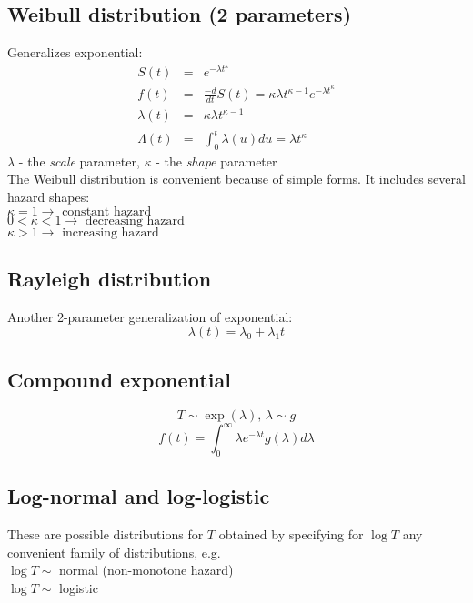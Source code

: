 \documentclass[11pt,slidesonly,semrot,portrait,palatino]{book}
\begin{document}
\subsection{\bf Weibull distribution (2 parameters)}
Generalizes exponential:
\begin{eqnarray*}
S(t) & = & e^{-\lambda t^\kappa} \\[2ex]
f(t) & = & \frac{-d}{dt}S(t)=\kappa \lambda t^{\kappa-1}
e^{-\lambda t^\kappa}\\[2ex]
\lambda(t) & = & \kappa \lambda t^{\kappa-1}\\[2ex]
\Lambda(t) & = & \int_0^t\lambda(u) du = \lambda t^\kappa
\end{eqnarray*}
\noindent
$\lambda$ -  the {\em scale} parameter, $\kappa$  - the {\em shape} parameter
\\[2ex]
The Weibull distribution is convenient because of simple
forms.  It includes several hazard shapes:\\[2ex]
$\kappa=1 \rightarrow \mbox{ constant hazard}$ \\[1ex]
$0<\kappa<1 \rightarrow \mbox{ decreasing hazard}$ \\[1ex]
$\kappa > 1 \rightarrow \mbox{ increasing hazard}$
\subsection{Rayleigh distribution}
Another 2-parameter generalization of exponential:
\[\lambda(t)=\lambda_0+\lambda_1 t\]
\subsection{Compound exponential}
\[T\sim \exp(\lambda), \, \lambda\sim g\]
\[ f(t)=\int_0^\infty \lambda e^{-\lambda t}g(\lambda)d\lambda\]
\subsection{Log-normal and log-logistic}
These are possible distributions for $T$ obtained by specifying for $\log T$
any convenient family of distributions, e.g.\\[1ex]
$\log T \sim$ normal (non-monotone hazard) \\[1ex]
$\log T \sim$ logistic
\end{document}
